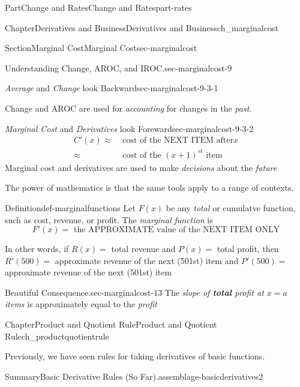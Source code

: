 \documentclass[oneside,10pt,]{tufte-book}
\newcommand{\alert}[1]{\textbf{\textit{#1}}}
\numberwithin{equation}{chapter}
\newcommand{\amp}{&}
\begin{document}
\begin{partptx}{Part}{Change and Rates}{}{Change and Rates}{}{}{part-rates}
\begin{chapterptx}{Chapter}{Derivatives and Business}{}{Derivatives and Business}{}{}{ch_marginalcost}
\begin{sectionptx}{Section}{Marginal Cost}{}{Marginal Cost}{}{}{sec-marginalcost}
\begin{paragraphs}{Understanding Change, AROC, and IROC.}{sec-marginalcost-9}
\begin{descriptionlist}
\begin{dlimedium}{\emph{Average} and \emph{Change} look Backward}{sec-marginalcost-9-3-1}
\par
Change and AROC are used for \emph{accounting} for changes in the \emph{past}.%
\end{dlimedium}%
\begin{dlimedium}{\emph{Marginal Cost} and \emph{Derivatives} look Foreward}{sec-marginalcost-9-3-2}%
%
\begin{align*}
C'(x) \approx \amp \text{ cost of the NEXT ITEM after} x  \\
\approx \amp \text{ cost of the } (x+1)^{st} \text{ item} 
\end{align*}
Marginal cost and derivatives are used to make \emph{decisions} about the \emph{future}%
\end{dlimedium}%
\end{descriptionlist}
\end{paragraphs}%
\par\medskip
The power of mathematics is that the same tools apply to a range of contexts.%
\begin{definition}{Definition}{}{def-marginalfunctions}%
Let \(F(x)\) be any \emph{total} or cumulatve function, such as cost, revenue, or profit. The \emph{marginal function} is%
\begin{equation*}
F'(x) = \text{ the APPROXIMATE value of the NEXT ITEM ONLY} 
\end{equation*}
%
\end{definition}
In other words, if \(R(x) = \) total revenue and \(P(x) = \) total profit, then \(R'(500) = \) approximate revenue of the next (501st) item and \(P'(500) = \) approximate revenue of the next (501st) item%
\begin{paragraphs}{Beautiful Consequence.}{sec-marginalcost-13}%
The \emph{slope of \alert{total} profit at \(x=a\) items} is approximately equal to the \emph{profit}%
\end{paragraphs}%
\end{sectionptx}
\end{chapterptx}
%
\typeout{************************************************}
\typeout{************************************************}
%
\begin{chapterptx}{Chapter}{Product and Quotient Rule}{}{Product and Quotient Rule}{}{}{ch_productquotientrule}
\renewcommand*{\chaptername}{Chapter}
\begin{introduction}{}%
Previously, we have seen rules for taking derivatives of basic functions.%
\begin{assemblage}{Summary}{Basic Derivative Rules (So Far).}{assemblage-basicderivatives2}%

\end{assemblage}
\end{introduction}
\end{chapterptx}
\end{partptx}
\end{document}

